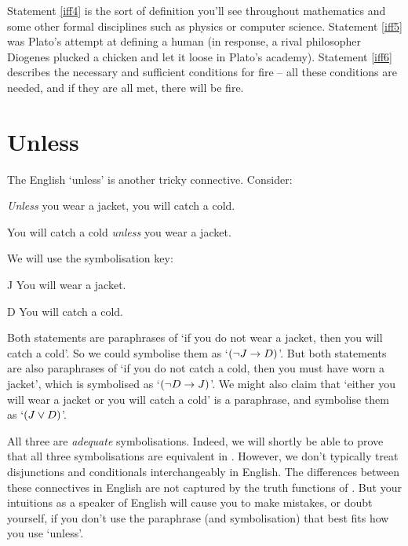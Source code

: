 \documentclass[PHIL101-Textbook.tex]{subfiles}
\begin{document}
Statement \ref{iff4} is the sort of definition you'll see throughout mathematics and some other formal disciplines such as physics or computer science. Statement \ref{iff5} was Plato's attempt at defining a human (in response, a rival philosopher Diogenes plucked a chicken and let it loose in Plato's academy). Statement \ref{iff6} describes the necessary and sufficient conditions for fire -- all these conditions are needed, and if they are all met, there will be fire.


\pagebreak
\section{Unless}

The English `unless' is another tricky connective. Consider:

\begin{earg}
\item[\ex{unless1}] \emph{Unless} you wear a jacket, you will catch a cold. 
\item[\ex{unless2}] You will catch a cold \emph{unless} you wear a jacket. 
\end{earg}
We will use the symbolisation key:
	\begin{ekey}
		\item[J] You will wear a jacket.
		\item[D] You will catch a cold.
	\end{ekey}
Both statements are paraphrases of `if you do not wear a jacket, then you will catch a cold'. So we could symbolise them as `$(\neg J \rightarrow D)$'. But both statements are also paraphrases of `if you do not catch a cold, then you must have worn a jacket', which is symbolised as `$(\neg D \rightarrow J)$'. We might also claim that `either you will wear a jacket or you will catch a cold' is a paraphrase, and symbolise them as `$(J \vee D)$'.

All three are \emph{adequate} symbolisations. Indeed, we will shortly be able to prove that all three symbolisations are equivalent in \tfl. However, we don't typically treat disjunctions and conditionals interchangeably in English. The differences between these connectives in English are not captured by the truth functions of \tfl. But your intuitions as a speaker of English will cause you to make mistakes, or doubt yourself, if you don't use the paraphrase (and symbolisation) that best fits how you use `unless'.
\end{document}
